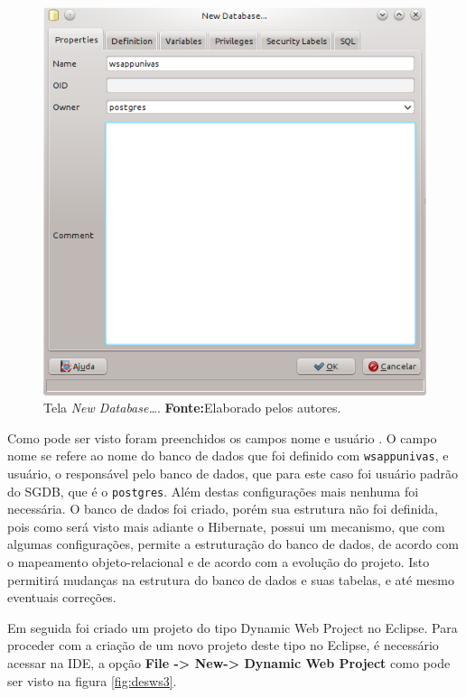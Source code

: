	\begin{figure}[h!]
		\centerline{\includegraphics[scale=1]{./imagens/2_q_metodologico/4_procedimentos_resultados/43_webservice/432_desenvolvimento/desws2.png}}
		\caption[Tela \textit{New Database\ldots}]{Tela \textit{New Database\ldots}.
			\textbf{Fonte:}Elaborado pelos autores.}
		\label{fig:desws2}
	\end{figure}
	
	\pagebreak

	\par Como pode ser visto foram preenchidos os campos nome e usuário . O campo
nome se refere ao nome do banco de dados que foi definido com
\texttt{wsappunivas}, e usuário, o responsável pelo banco de dados, que para
este caso foi usuário padrão do SGDB, que é o \texttt{postgres}. Além destas
configurações mais nenhuma foi necessária. O banco de dados foi criado, porém
sua estrutura não foi definida, pois como será visto mais adiante o Hibernate,
possui um mecanismo, que com algumas configurações, permite a estruturação do
banco de dados, de acordo com o mapeamento objeto-relacional e de acordo com a
evolução do projeto. Isto permitirá mudanças na estrutura do banco de dados e
suas tabelas, e até mesmo eventuais correções.
	
	\par Em seguida foi criado um projeto do tipo Dynamic Web Project no
Eclipse. Para proceder com a criação de um novo projeto deste tipo no Eclipse, é
necessário acessar na IDE, a opção \textbf{File -> New-> Dynamic Web Project}
como pode ser visto na figura \ref{fig:desws3}.

